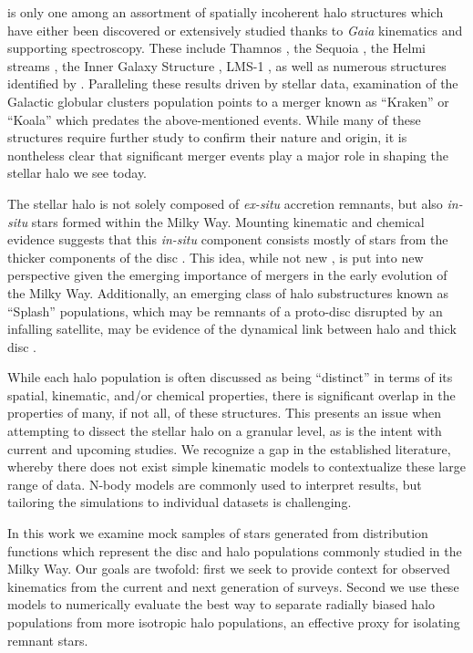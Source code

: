 \gse is only one among an assortment of spatially incoherent halo structures which have either been discovered or extensively studied thanks to \textit{Gaia} kinematics and supporting spectroscopy. These include Thamnos \parencite{koppelman19b}, the Sequoia \parencite{myeong19}, the Helmi streams \parencite{helmi99,koppelman18,koppelman19a}, the Inner Galaxy Structure \parencite[IGS, also known as Heracles;][]{horta21a}, LMS-1 \parencite{yuan20}, as well as numerous structures identified by \textcite{naidu20}. Paralleling these results driven by stellar data, examination of the Galactic globular clusters population points to a merger known as ``Kraken'' \parencite{kruijssen20} or ``Koala'' \parencite{forbes20} which predates the above-mentioned events. While many of these structures require further study to confirm their nature and origin, it is nontheless clear that significant merger events play a major role in shaping the stellar halo we see today.

The stellar halo is not solely composed of \textit{ex-situ} accretion remnants, but also \textit{in-situ} stars formed within the Milky Way. Mounting kinematic and chemical evidence suggests that this \textit{in-situ} component consists mostly of stars from the thicker components of the disc \parencite{helmi18,haywood18,dimatteo19}. This idea, while not new \parencite[e.g.][]{nissen10}, is put into new perspective given the emerging importance of mergers in the early evolution of the Milky Way. Additionally, an emerging class of halo substructures known as ``Splash'' populations, which may be remnants of a proto-disc disrupted by an infalling satellite, may be evidence of the dynamical link between halo and thick disc \parencite{belokurov20,naidu20,lian20}.

While each halo population is often discussed as being ``distinct'' in terms of its spatial, kinematic, and/or chemical properties, there is significant overlap in the properties of many, if not all, of these structures. This presents an issue when attempting to dissect the stellar halo on a granular level, as is the intent with current and upcoming studies. We recognize a gap in the established literature, whereby there does not exist simple kinematic models to contextualize these large range of data. N-body models are commonly used to interpret results, but tailoring the simulations to individual datasets is challenging.

In this work we examine mock samples of stars generated from distribution functions which represent the disc and halo populations commonly studied in the Milky Way. Our goals are twofold: first we seek to provide context for observed kinematics from the current and next generation of surveys. Second we use these models to numerically evaluate the best way to separate radially biased halo populations from more isotropic halo populations, an effective proxy for isolating \gse remnant stars.

